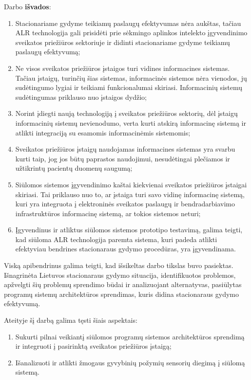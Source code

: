 Darbo \textbf{išvados}:
\begin{enumerate}
    \item Stacionariame gydyme teikiamų paslaugų efektyvumas nėra aukštas, tačiau ALR technologija gali prisidėti prie sėkmingo aplinkos intelekto įgyvendinimo sveikatos priežiūros sektoriuje ir didinti stacionariame gydyme teikiamų paslaugų efektyvumą;
    \item Ne visos sveikatos priežiūros įstaigos turi vidines informacines sistemas. Tačiau įstaigų, turinčių šias sistemas, informacinės sistemos nėra vienodos, jų sudėtingumo lygiai ir teikiami funkcionalumai skiriasi. Informacinių sistemų sudėtingumas priklauso nuo įstaigos dydžio;
    \item Norint įdiegti naują technologiją į sveikatos priežiūros sektorių, dėl įstaigų informacinių sistemų nevienodumo, verta kurti atskirą informacinę sistemą ir atlikti integraciją su esamomis informacinėmis sistemomis;
    \item Sveikatos priežiūros įstaigų naudojamas informacines sistemas yra svarbu kurti taip, jog jos būtų paprastos naudojimui, nesudėtingai plečiamos ir užtikrintų pacientų duomenų saugumą;
    \item Siūlomos sistemos įgyvendinimo kaštai kiekvienai sveikatos priežiūros įstaigai skiriasi. Tai priklauso nuo to, ar įstaiga turi savo vidinę informacinę sistemą, kuri yra integruota į elektroninės sveikatos paslaugų ir bendradarbiavimo infrastruktūros informacinę sistemą, ar tokios sistemos neturi;
    \item Įgyvendinus ir atliktus siūlomos sistemos prototipo testavimą, galima teigti, kad siūloma ALR technologija paremta sistema, kuri padeda atlikti efektyviau bendrines stacionaraus gydymo procedūras, yra įgyvendinama.
\end{enumerate}

Viską apibendrinus galima teigti, kad išsikeltas darbo tikslas buvo pasiektas. Išnagrinėta Lietuvos stacionaraus gydymo situacija, identifikuotos problemos, apžvelgti šių problemų sprendimo būdai ir analizuojant alternatyvas, pasiūlytas programų sistemų architektūros sprendimas, kuris didina stacionaraus gydymo efektyvumą.

Ateityje šį darbą galima tęsti šiais aspektais:
\begin{enumerate}
    \item Sukurti pilnai veikiantį siūlomos programų sistemos architektūros sprendimą ir integruoti į pasirinktą sveikatos priežiūros įstaigą;
    \item Išanalizuoti ir atlikti žmogaus gyvybinių požymių sensorių diegimą į siūlomą sistemą.
\end{enumerate}